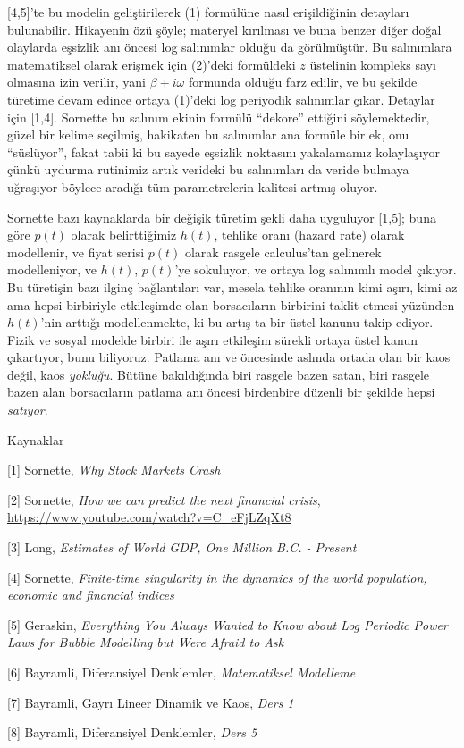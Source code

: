 \documentclass[12pt,fleqn]{article}\usepackage{../../common}
\begin{document}
[4,5]'te bu modelin geliştirilerek (1) formülüne nasıl erişildiğinin
detayları bulunabilir. Hikayenin özü şöyle; materyel kırılması ve buna
benzer diğer doğal olaylarda eşsizlik anı öncesi log salınımlar olduğu da
görülmüştür. Bu salınımlara matematiksel olarak erişmek için (2)'deki
formüldeki $z$ üstelinin kompleks sayı olmasına izin verilir, yani $\beta +
i\omega$ formunda olduğu farz edilir, ve bu şekilde türetime devam edince
ortaya (1)'deki log periyodik salınımlar çıkar. Detaylar için
[1,4]. Sornette bu salınım ekinin formülü ``dekore'' ettiğini
söylemektedir, güzel bir kelime seçilmiş, hakikaten bu salınımlar ana
formüle bir ek, onu ``süslüyor'', fakat tabii ki bu sayede eşsizlik
noktasını yakalamamız kolaylaşıyor çünkü uydurma rutinimiz artık verideki
bu salınımları da veride bulmaya uğraşıyor böylece aradığı tüm
parametrelerin kalitesi artmış oluyor.

Sornette bazı kaynaklarda bir değişik türetim şekli daha uyguluyor [1,5];
buna göre $p(t)$ olarak belirttiğimiz $h(t)$, tehlike oranı (hazard rate)
olarak modellenir, ve fiyat serisi $p(t)$ olarak rasgele calculus'tan
gelinerek modelleniyor, ve $h(t)$, $p(t)$'ye sokuluyor, ve ortaya log
salınımlı model çıkıyor. Bu türetişin bazı ilginç bağlantıları var, mesela
tehlike oranının kimi aşırı, kimi az ama hepsi birbiriyle etkileşimde olan
borsacıların birbirini taklit etmesi yüzünden $h(t)$'nin arttığı
modellenmekte, ki bu artış ta bir üstel kanunu takip ediyor. Fizik ve
sosyal modelde birbiri ile aşırı etkileşim sürekli ortaya üstel kanun
çıkartıyor, bunu biliyoruz. Patlama anı ve öncesinde aslında ortada olan
bir kaos değil, kaos {\em yokluğu}. Bütüne bakıldığında biri rasgele bazen
satan, biri rasgele bazen alan borsacıların patlama anı öncesi birdenbire
düzenli bir şekilde hepsi {\em satıyor}. 

Kaynaklar

[1] Sornette, {\em Why Stock Markets Crash}

[2] Sornette, {\em How we can predict the next financial crisis}, \url{https://www.youtube.com/watch?v=C_eFjLZqXt8}

[3] Long, {\em Estimates of World GDP, One Million B.C. - Present}

[4] Sornette, {\em Finite-time singularity in the dynamics of the world population, economic and financial indices}

[5] Geraskin, {\em Everything You Always Wanted to Know about Log Periodic Power Laws for Bubble Modelling but Were Afraid to Ask}

[6] Bayramli, Diferansiyel Denklemler, {\em Matematiksel Modelleme}

[7] Bayramli, Gayrı Lineer Dinamik ve Kaos, {\em Ders 1}

[8] Bayramli, Diferansiyel Denklemler, {\em Ders 5}
\end{document}
